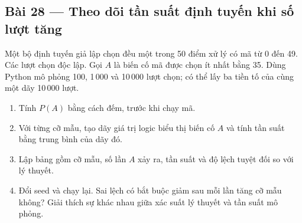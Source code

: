 \documentclass[11pt,a4paper]{article}
\begin{document}
\par\medskip

\noindent\begin{minipage}{\linewidth}
\subsection*{Bài 28 --- Theo dõi tần suất định tuyến khi số lượt tăng}

Một bộ định tuyến giả lập chọn đều một trong 50 điểm xử lý có mã từ 0 đến 49. Các lượt chọn độc lập. Gọi \(A\) là biến cố mã được chọn ít nhất bằng 35. Dùng Python mô phỏng 100, 1\,000 và 10\,000 lượt chọn; có thể lấy ba tiền tố của cùng một dãy 10\,000 lượt.

\begin{enumerate}[label=\alph*)]
\item Tính \(P(A)\) bằng cách đếm, trước khi chạy mã.
\item Với từng cỡ mẫu, tạo dãy giá trị logic biểu thị biến cố \(A\) và tính tần suất bằng trung bình của dãy đó.
\item Lập bảng gồm cỡ mẫu, số lần \(A\) xảy ra, tần suất và độ lệch tuyệt đối so với lý thuyết.
\item Đổi seed và chạy lại. Sai lệch có bắt buộc giảm sau mỗi lần tăng cỡ mẫu không? Giải thích sự khác nhau giữa xác suất lý thuyết và tần suất mô phỏng.
\end{enumerate}

\end{minipage}\par
\end{document}

